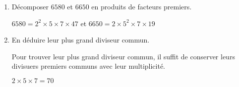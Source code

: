     \begin{enumerate}
        \item Décomposer $\num{6580}$ et $\num{6650}$ en produits de facteurs premiers.

        $\num{6580}=2^2\times 5\times 7\times 47$ et $\num{6650}=2\times 5^2\times 7\times 19$
        \item En déduire leur plus grand diviseur commun.

        Pour trouver leur plus grand diviseur commun, il suffit de conserver leurs divisuers premiers communs avec leur multiplicité.

        $2\times 5\times 7 = 70$
    \end{enumerate}
